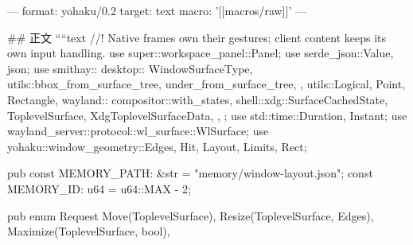 ---
format: yohaku/0.2
target: text
macro: '[[macros/raw]]'
---

## 正文
````text
//! Native frames own their gestures; client content keeps its own input handling.
use super::workspace_panel::Panel;
use serde_json::{Value, json};
use smithay::{
    desktop::{
        WindowSurfaceType,
        utils::{bbox_from_surface_tree, under_from_surface_tree},
    },
    utils::{Logical, Point, Rectangle},
    wayland::{
        compositor::with_states,
        shell::xdg::{SurfaceCachedState, ToplevelSurface, XdgToplevelSurfaceData},
    },
};
use std::time::{Duration, Instant};
use wayland_server::protocol::wl_surface::WlSurface;
use yohaku::window_geometry::{Edges, Hit, Layout, Limits, Rect};

pub const MEMORY_PATH: &str = "memory/window-layout.json";
const MEMORY_ID: u64 = u64::MAX - 2;

pub enum Request {
    Move(ToplevelSurface),
    Resize(ToplevelSurface, Edges),
    Maximize(ToplevelSurface, bool),
}

